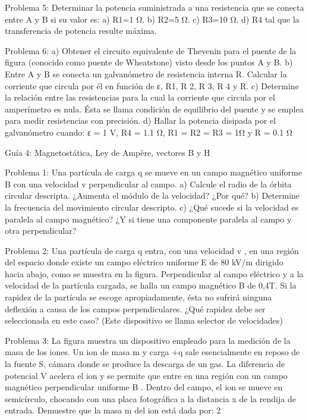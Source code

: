 Problema 5:
Determinar  la  potencia  suministrada  a  una  resistencia  que  se conecta entre A y B si su valor es:
a)  R1=1 Ω. b)  R2=5 Ω. c)   R3=10 Ω.
d)  R4 tal que la transferencia de potencia resulte máxima.

Problema 6:
a)	Obtener el circuito equivalente de Thevenin para el puente de la figura (conocido como puente de Wheatstone) visto desde los puntos A y B.
b)	Entre A y B se conecta un galvanómetro de resistencia interna R. Calcular la corriente que circula por él en función de ε, R1, R 2, R 3, R 4 y R.
c)	Determine  la  relación  entre  las  resistencias  para  la cual la
corriente que circula por el amperímetro es nula. Ésta se llama condición de equilibrio del puente y se emplea para medir resistencias con precisión.
d)	Hallar  la  potencia  disipada  por  el  galvanómetro  cuando:
ε = 1 V, R4 = 1.1 Ω, R1 = R2 = R3 = 1Ω y R = 0.1 Ω
 


Guía 4: Magnetostática, Ley de Ampère, vectores B y H

Problema 1:
Una partícula de carga q se mueve en un campo magnético uniforme B con una velocidad v
perpendicular al campo.
a)	Calcule el radio de la órbita circular descripta. ¿Aumenta el módulo de la velocidad? ¿Por qué?
b)	Determine la frecuencia del movimiento circular descripto.
c)	¿Qué sucede si la velocidad es paralela al campo magnético? ¿Y si tiene una componente paralela al campo y otra perpendicular?

Problema 2:
Una partícula de carga q entra, con una velocidad v , en una región del espacio donde existe un campo eléctrico uniforme E de 80 kV/m dirigido hacia abajo, como se muestra en la figura. Perpendicular al campo eléctrico y a la velocidad de la partícula cargada, se halla un campo
magnético B de 0,4T. Si la rapidez de la partícula se escoge apropiadamente, ésta no sufrirá ninguna deflexión a causa de los campos perpendiculares. ¿Qué rapidez debe ser seleccionada en este caso? (Este dispositivo se llama selector de velocidades)

Problema 3:
La figura muestra un dispositivo empleado para la medición de la masa de los iones. Un ion de masa m y carga +q sale esencialmente en reposo de la fuente S, cámara donde se produce la descarga de un gas. La diferencia de potencial V acelera el ion y se permite que entre  en  una  región  con  un  campo  magnético  perpendicular
uniforme B . Dentro del campo, el ion se mueve en semicírculo, chocando con una placa fotográfica a la distancia x de la rendija de entrada. Demuestre que la masa m del ion está dada por:
2
 
